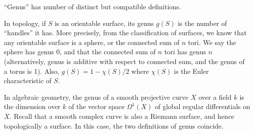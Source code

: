 \documentclass[12pt]{article}
\begin{document}
``Genus'' has number of distinct but compatible definitions.

In topology, if $S$ is an orientable surface, its genus $g(S)$ is the number of ``handles'' it has.
More precisely, from the classification of surfaces, we know that any orientable
surface is a sphere, or the connected sum of $n$ tori.  We say the sphere
has genus 0, and that the connected sum of $n$ tori has genus $n$ 
(alternatively, genus is additive with respect to connected sum, and the genus of a torus is 1).
Also, $g(S)=1-\chi(S)/2$ where $\chi(S)$ is the Euler characteristic of $S$. 

In algebraic geometry, the {genus} of a smooth projective curve $X$ over a field $k$ is the
dimension over $k$ of the vector space $\Omega^1(X)$ of global regular
differentials on $X$.  Recall that a smooth complex curve is also a Riemann surface,
and hence topologically a surface.  In this case, the two definitions of genus coincide.
\end{document}
